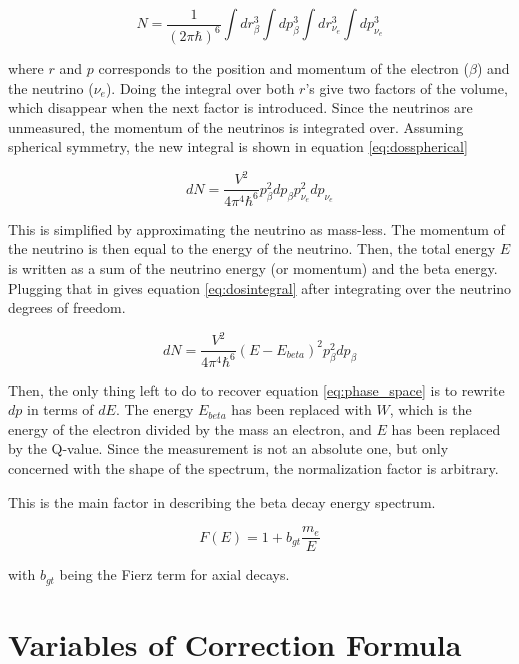 \documentclass[../MaxHughesThesis.tex]{subfiles}
\begin{document}
\begin{equation}
	N = \frac{1}{(2\pi\hbar)^{6}}\int dr^{3}_{\beta} \int dp^{3}_{\beta}\int dr^{3}_{\nu_{e}} \int dp^{3}_{\nu_{e}} 
	\label{eq:densityofstates}
\end{equation}

where $r$ and $p$ corresponds to the position and momentum of the electron ($\beta$) and the neutrino ($\nu_{e}$).
Doing the integral over both $r$'s give two factors of the volume, which disappear when the next factor is introduced.
Since the neutrinos are unmeasured, the momentum of the neutrinos is integrated over. 
Assuming spherical symmetry, the new integral is shown in equation \ref{eq:dosspherical}

\begin{equation}
	dN = \frac{V^{2}}{4\pi^{4}\hbar^{6}}p_{\beta}^{2}dp_{\beta}p_{\nu_{e}}^{2}dp_{\nu_{e}}
	\label{eq:dosspherical}
\end{equation}

This is simplified by approximating the neutrino as mass-less.
The momentum of the neutrino is then equal to the energy of the neutrino.
Then, the total energy $E$ is written as a sum of the neutrino energy (or momentum) and the beta energy.
Plugging that in gives equation \ref{eq:dosintegral} after integrating over the neutrino degrees of freedom. 

\begin{equation}
	dN = \frac{V^{2}}{4\pi^{4}\hbar^{6}}(E - E_{beta})^{2}p_{\beta}^{2}dp_{\beta}
	\label{eq:dosintegral}
\end{equation}

Then, the only thing left to do to recover equation \ref{eq:phase_space} is to rewrite $dp$ in terms of $dE$. 
The energy $E_{beta}$ has been replaced with $W$, which is the energy of the electron divided by the mass an electron, and $E$ has been replaced by the Q-value.
Since the measurement is not an absolute one, but only concerned with the shape of the spectrum, the normalization factor is arbitrary.

This is the main factor in describing the beta decay energy spectrum.

\begin{equation}
	F(E) = 1 + b_{gt}\frac{m_{e}}{E}
	\label{eq:fierzshape}
\end{equation}

with $b_{gt}$ being the Fierz term for axial decays.

\section{Variables of Correction Formula}
\end{document}
